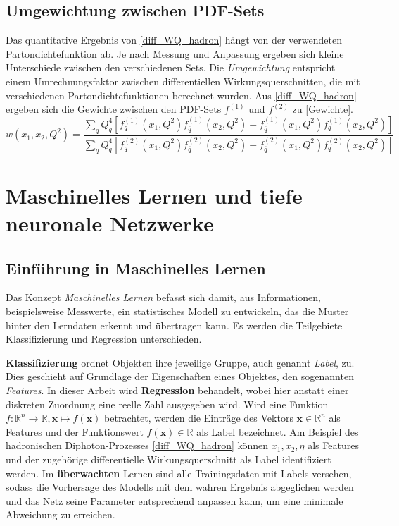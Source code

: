 \section{Umgewichtung zwischen PDF-Sets}
Das quantitative Ergebnis von \textsf{\autoref{diff_WQ_hadron}} hängt von der verwendeten Partondichtefunktion ab. Je nach Messung und Anpassung ergeben sich kleine Unterschiede zwischen den verschiedenen Sets. Die \textit{Umgewichtung} entspricht einem Umrechnungsfaktor zwischen differentiellen Wirkungsquerschnitten, die mit verschiedenen Partondichtefunktionen berechnet wurden. Aus \textsf{\autoref{diff_WQ_hadron}}  ergeben sich die Gewichte zwischen den PDF-Sets $f^{(1)}$ und $f^{(2)}$ zu \textsf{\autoref{Gewichte}}.
\begin{equation}
w\left(x_1, x_2, Q^2\right) = \frac{ \sum_{q} Q_q^4 \left[f_q^{(1)}(x_1, Q^2)f_{\overline{q}}^{(1)}(x_2, Q^2) +f_{\overline{q}}^{(1)}(x_1, Q^2)f_{q}^{(1)}(x_2, Q^2) \right]}{\sum_{q} Q_q^4 \left[f_q^{(2)}(x_1, Q^2)f_{\overline{q}}^{(2)}(x_2, Q^2) +f_{\overline{q}}^{(2)}(x_1, Q^2)f_{q}^{(2)}(x_2, Q^2) \right]}
\label{Gewichte}
\end{equation}
\chapter{Maschinelles Lernen und tiefe neuronale Netzwerke}
\label{3}
\section{Einführung in Maschinelles Lernen}
Das Konzept \textit{Maschinelles Lernen} befasst sich damit, aus Informationen, beispielsweise Messwerte, ein statistisches Modell zu entwickeln, das die Muster hinter den Lerndaten erkennt und übertragen kann. Es werden die Teilgebiete Klassifizierung und Regression unterschieden.

\textbf{Klassifizierung} ordnet Objekten ihre jeweilige Gruppe, auch genannt \textit{Label}, zu. Dies geschieht auf Grundlage der Eigenschaften eines Objektes, den sogenannten \textit{Features}.
In dieser Arbeit wird \textbf{Regression} behandelt, wobei hier anstatt einer diskreten Zuordnung eine reelle Zahl ausgegeben wird. Wird eine Funktion $f: \mathbb{R}^n \rightarrow \mathbb{R}, \mathbf{x} \mapsto f(\mathbf{x})$ betrachtet, werden die Einträge des Vektors $\mathbf{x} \in \mathbb{R}^n$ als Features und der Funktionswert $f(\mathbf{x}) \in \mathbb{R}$ als Label bezeichnet. Am Beispiel des hadronischen Diphoton-Prozesses \textsf{\autoref{diff_WQ_hadron}} können $x_1, x_2, \eta$ als Features und der zugehörige differentielle Wirkungsquerschnitt als Label identifiziert werden. 
Im \textbf{überwachten} Lernen sind alle Trainingsdaten mit Labels versehen, sodass die Vorhersage des Modells mit dem wahren Ergebnis abgeglichen werden und das Netz seine Parameter entsprechend anpassen kann, um eine minimale Abweichung zu erreichen. 


